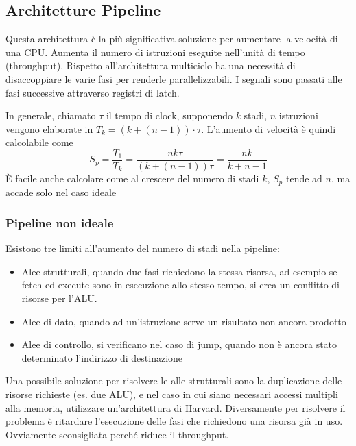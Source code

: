 \documentclass[../template]{subfiles}
\begin{document}
\subsection{Architetture Pipeline}
Questa architettura è la più significativa soluzione per aumentare la velocità di una CPU.
Aumenta il numero di istruzioni eseguite nell'unità di tempo (throughput).
Rispetto all'architettura multiciclo ha una necessità di disaccoppiare le varie fasi per renderle parallelizzabili.
I segnali sono passati alle fasi successive attraverso registri di latch.

In generale, chiamato $\tau$ il tempo di clock, supponendo $k$ stadi, $n$ istruzioni vengono elaborate in $T_k = (k +
(n-1)) \cdot \tau$.
L'aumento di velocità è quindi calcolabile come
\[
    S_p = \frac{T_1}{T_k}  = \frac{nk\tau}{(k + (n-1)) \tau} = \frac{nk}{k + n -1}
\]
È facile anche calcolare come al crescere del numero di stadi $k$, $S_p$ tende ad $n$, ma accade solo nel caso ideale

\subsubsection{Pipeline non ideale}
Esistono tre limiti all'aumento del numero di stadi nella pipeline:
\begin{itemize}
    \item Alee strutturali, quando due fasi richiedono la stessa risorsa, ad esempio se fetch ed execute sono in
        esecuzione allo stesso tempo, si crea un conflitto di risorse per l'ALU.
    \item Alee di dato, quando ad un'istruzione serve un risultato non ancora prodotto
    \item Alee di controllo, si verificano nel caso di jump, quando non è ancora stato determinato l'indirizzo
        di destinazione
\end{itemize}

Una possibile soluzione per risolvere le alle strutturali sono la duplicazione delle risorse richieste (es. due ALU), e nel
caso in cui siano necessari accessi multipli alla memoria, utilizzare un'architettura di Harvard.
Diversamente per risolvere il problema è ritardare l'esecuzione delle fasi che richiedono una risorsa già in uso.
Ovviamente sconsigliata perché riduce il throughput.
\end{document}
